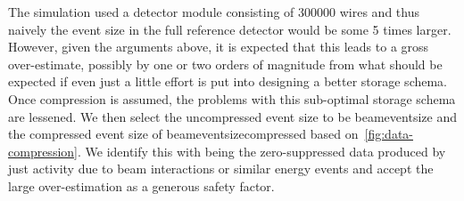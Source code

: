 The simulation used a detector module consisting of 300000 wires and
thus naively the event size in the full reference detector would be some 5 times
larger.
However, given the arguments above, it is expected that this leads to
a gross over-estimate, possibly by one or two orders of magnitude from
what should be expected if even just a little effort is put into
designing a better storage schema.
Once compression is assumed, the problems with this sub-optimal
storage schema are lessened.
We then select the uncompressed event size to be beameventsize and
the compressed event size of beameventsizecompressed based
on~\ref{fig:data-compression}.
We identify this with being the zero-suppressed data produced by just
activity due to beam interactions or similar energy events and accept
the large over-estimation as a generous safety factor.






